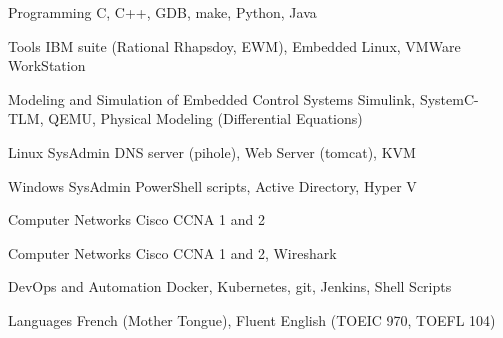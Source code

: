 

\begin{cvskills}
{

    \cvskill
    {Programming} %
    {C, C++, GDB, make, Python, Java} %

    \cvskill
    {Tools}
    {IBM suite (Rational Rhapsdoy, EWM), Embedded Linux, VMWare WorkStation}

    \cvskill
    {Modeling and Simulation of Embedded Control Systems} %
    {Simulink, SystemC-TLM, QEMU, Physical Modeling (Differential Equations)} %

	}{}
{

    \cvskill
    {Linux SysAdmin} %
    {DNS server (pihole), Web Server (tomcat), KVM} %

    \cvskill
    {Windows SysAdmin} %
    {PowerShell scripts, Active Directory, Hyper V} %

    \cvskill
    {Computer Networks} %
    {Cisco CCNA 1 and 2} %

}{}
    \cvskill
    {Computer Networks} %
    {Cisco CCNA 1 and 2, Wireshark} %

    \cvskill
    {DevOps and Automation} %
    {Docker, Kubernetes, git, Jenkins, Shell Scripts} %

    \cvskill
    {Languages} %
    {French (Mother Tongue), Fluent English (TOEIC 970, TOEFL 104)} %

\end{cvskills}
